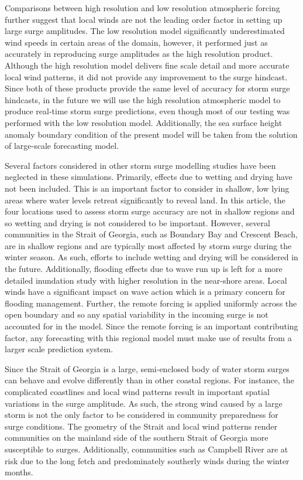 \documentclass[letterpaper]{tATO2e}
\begin{document}
Comparisons between high resolution and low resolution atmospheric forcing further suggest that local winds are not the leading order factor in setting up large surge amplitudes. The low resolution model significantly underestimated wind speeds in certain areas of the domain, however, it performed just as accurately in reproducing surge amplitudes as the high resolution product.  Although the high resolution model delivers fine scale detail and more accurate local wind patterns, it did not provide any improvement to the surge hindcast. Since both of these products provide the same level of accuracy for storm surge hindcasts, in the future we will use the high resolution atmospheric model to produce real-time storm surge predictions, even though most of our testing was performed with the low resolution model. {\color{red} Additionally, the sea surface height anomaly boundary condition of the present model will be taken from the solution of large-scale forecasting model.}

Several factors considered in other storm surge modelling studies have been neglected in these simulations. Primarily, effects due to wetting and drying have not been included. This is an important factor to consider in shallow, low lying areas where water levels retreat significantly to reveal land. In this article, the four locations used to assess storm surge accuracy are not in shallow regions and so wetting and drying is not considered to be important. However, several communities in the Strait of Georgia, such as Boundary Bay and Crescent Beach, are in shallow regions and are typically most affected by storm surge during the winter season. As such, efforts to include wetting and drying will be considered in the future. Additionally, flooding effects due to wave run up is left for a more detailed inundation study with higher resolution in the near-shore areas. Local winds have a significant impact on wave action which is a primary concern for flooding management. Further, the remote forcing is applied uniformly across the open boundary and so any spatial variability in the incoming surge is not accounted for in the model. Since the remote forcing is an important contributing factor, any forecasting with this regional model must make use of results from a larger scale prediction system. 

Since the Strait of Georgia is a large, semi-enclosed body of water storm surges can behave and evolve differently than in other coastal regions. For instance, the complicated coastlines and local wind patterns result in important spatial variations in the surge amplitude. As such, the strong wind caused by a large storm is not the only factor to be considered in community preparedness for surge conditions. The geometry of the Strait and local wind patterns render communities on the mainland side of the southern Strait of Georgia more susceptible to surges. Additionally, communities such as Campbell River are at risk due to the long fetch and predominately southerly winds during the winter months.
\end{document}

